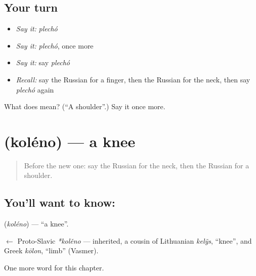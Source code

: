 \subsection*{Your turn}
\begin{itemize}
\raggedright
  \item \emph{Say it:} \emph{plechó}
  \item \emph{Say it:} \emph{plechó}, once more
  \item \emph{Say it:} say \emph{plechó}
  \item \emph{Recall:} say the Russian for a finger, then the Russian for the neck, then say \emph{plechó} again
\end{itemize}

\begin{tcolorbox}[breakable,colback=teal!4,colframe=teal!35!black,title={Before you move on}]
What does  mean? (\textquotedblleft{}A shoulder\textquotedblright{}.) Say it once more.
\end{tcolorbox}
\section[\texorpdfstring{\ru{колено} (koléno)}{колено (koléno)}]{ (koléno) — a knee}

\label{lesson:RU-C30-knee}



\begin{quote}
Before the new one: say the Russian for the neck, then the Russian for a shoulder.
\end{quote}

\subsection*{You'll want to know: }
\textbf{} (\emph{koléno}) — \textquotedblleft{}a knee\textquotedblright{}.

\begin{cousinweb}
\textbf{} $\leftarrow$ Proto-Slavic \emph{*kolěno} — inherited, a cousin of Lithuanian \emph{kelỹs}, \textquotedblleft{}knee\textquotedblright{}, and Greek \emph{kōlon}, \textquotedblleft{}limb\textquotedblright{} (Vasmer).
\end{cousinweb}

\begin{grammarlens}[title={What you've built}]
One more word for this chapter.
\end{grammarlens}


